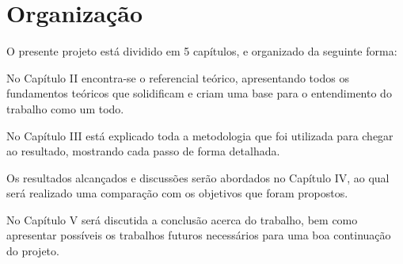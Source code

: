 \section{Organização}
O presente projeto está dividido em 5 capítulos, e organizado da seguinte forma:

No Capítulo II encontra-se o referencial teórico, apresentando todos os fundamentos teóricos que solidificam e criam uma base para o entendimento do trabalho como um todo.

No Capítulo III está explicado toda a metodologia que foi utilizada para chegar ao resultado, mostrando cada passo de forma detalhada.

Os resultados alcançados e discussões serão abordados no Capítulo IV, ao qual será realizado uma comparação com os objetivos que foram propostos.

No Capítulo V será discutida a conclusão acerca do trabalho, bem como apresentar possíveis os trabalhos futuros necessários para uma boa continuação do projeto.
    












 
